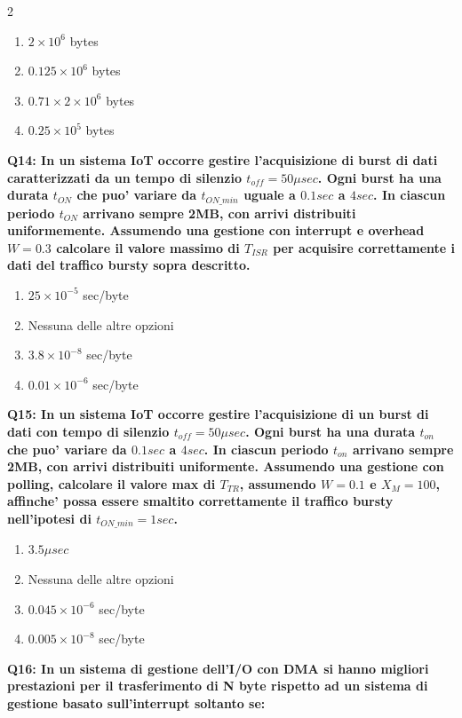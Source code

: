 \documentclass[10pt]{article}
\begin{document}
\begin{multicols}{2}
\begin{enumerate}[label=\arabic*.]
\item $2 \times 10^6$ bytes
\item $0.125 \times 10^6$ bytes
\item $0.71 \times 2 \times 10^6$ bytes
\item $0.25 \times 10^5$ bytes
\end{enumerate}
\textbf{Q14: In un sistema IoT occorre gestire l'acquisizione di burst di dati caratterizzati da un tempo di silenzio $t_{off}=50\mu sec$. Ogni burst ha una durata $t_{ON}$ che puo' variare da $t_{ON\_min}$ uguale a $0.1 sec$ a $4 sec$. In ciascun periodo $t_{ON}$ arrivano sempre 2MB, con arrivi distribuiti uniformemente.  Assumendo una gestione con interrupt e overhead $W=0.3$ calcolare il valore massimo di $T_{ISR}$ per acquisire correttamente i dati del traffico bursty sopra descritto.}

\begin{enumerate}[label=\arabic*.]
\item $25\times10^{-5}$ sec/byte
\item Nessuna delle altre opzioni
\item $3.8\times10^{-8}$ sec/byte
\item $0.01\times10^{-6}$ sec/byte
\end{enumerate}
\textbf{Q15: In un sistema IoT occorre gestire l'acquisizione di un burst di dati con tempo di silenzio $t_{off}=50 \mu sec$. Ogni burst ha una durata $t_{on}$ che puo' variare da $0.1 sec$ a $4 sec$. In ciascun periodo $t_{on}$ arrivano sempre 2MB, con arrivi distribuiti uniformente. Assumendo una gestione con polling, calcolare il valore max di $T_{TR}$, assumendo $W=0.1$ e $X_M = 100$, affinche' possa essere smaltito correttamente il traffico bursty nell'ipotesi di $t_{ON\_min}=1 sec$.}

\begin{enumerate}[label=\arabic*.]
\item $3.5 \mu sec$
\item Nessuna delle altre opzioni
\item $0.045\times10^{-6}$ sec/byte
\item $0.005\times10^{-8}$ sec/byte
\end{enumerate}
\textbf{Q16: In un sistema di gestione dell’I/O con DMA si hanno migliori prestazioni per il trasferimento di N byte rispetto ad un sistema di gestione basato sull’interrupt soltanto se:}


\end{multicols}
\end{document}
